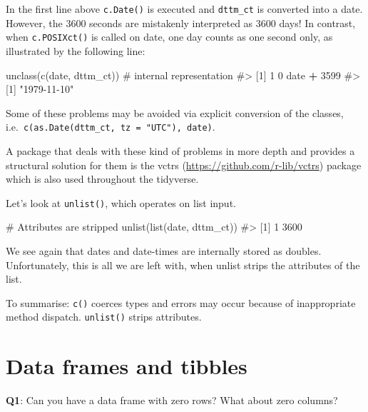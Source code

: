 \documentclass[
]{krantz}
\makeatletter
\newenvironment{Shaded}{\begin{snugshade}}{\end{snugshade}}
\newcommand{\CommentTok}[1]{\textcolor[rgb]{0.56,0.35,0.01}{\textit{#1}}}
\newcommand{\DecValTok}[1]{\textcolor[rgb]{0.00,0.00,0.81}{#1}}
\newcommand{\KeywordTok}[1]{\textcolor[rgb]{0.13,0.29,0.53}{\textbf{#1}}}
\newcommand{\NormalTok}[1]{#1}
\newcommand{\OperatorTok}[1]{\textcolor[rgb]{0.81,0.36,0.00}{\textbf{#1}}}
\newcommand{\StringTok}[1]{\textcolor[rgb]{0.31,0.60,0.02}{#1}}
\renewcommand{\href}[2]{#2 (\url{#1})}
\newenvironment{kframe}{%
\medskip{}
\setlength{\fboxsep}{.8em}
 \def\at@end@of@kframe{}%
 \ifinner\ifhmode%
  \def\at@end@of@kframe{\end{minipage}}%
  \begin{minipage}{\columnwidth}%
 \fi\fi%
 \def\FrameCommand##1{\hskip\@totalleftmargin \hskip-\fboxsep
 \colorbox{shadecolor}{##1}\hskip-\fboxsep
     \hskip-\linewidth \hskip-\@totalleftmargin \hskip\columnwidth}%
 \MakeFramed {\advance\hsize-\width
   \@totalleftmargin\z@ \linewidth\hsize
   \@setminipage}}%
 {\par\unskip\endMakeFramed%
 \at@end@of@kframe}
\renewenvironment{Shaded}{\begin{kframe}}{\end{kframe}}
\renewcommand{\KeywordTok} [1]{\textcolor[rgb]{0.00,0.44,0.13}{{#1}}}
\renewcommand{\DecValTok}  [1]{\textcolor[rgb]{0.25,0.63,0.44}{{#1}}}
\renewcommand{\StringTok}  [1]{\textcolor[rgb]{0.25,0.44,0.63}{{#1}}}
\renewcommand{\CommentTok} [1]{\textcolor[rgb]{0.38,0.63,0.69}{{#1}}}
\renewcommand{\NormalTok}  [1]{{#1}}
\makeatother
\begin{document}
In the first line above \texttt{c.Date()} is executed and \texttt{dttm\_ct} is converted into a date. However, the 3600 seconds are mistakenly interpreted as 3600 days! In contrast, when \texttt{c.POSIXct()} is called on date, one day counts as one second only, as illustrated by the following line:

\begin{Shaded}
\begin{Highlighting}[]
\KeywordTok{unclass}\NormalTok{(}\KeywordTok{c}\NormalTok{(date, dttm_ct))  }\CommentTok{# internal representation}
\CommentTok{#> [1] 1 0}
\NormalTok{date }\OperatorTok{+}\StringTok{ }\DecValTok{3599}
\CommentTok{#> [1] "1979-11-10"}
\end{Highlighting}
\end{Shaded}

Some of these problems may be avoided via explicit conversion of the classes, i.e.~\texttt{c(as.Date(dttm\_ct,\ tz\ =\ "UTC"),\ date)}.

A package that deals with these kind of problems in more depth and provides a structural solution for them is the \href{https://github.com/r-lib/vctrs}{vctrs} package which is also used throughout the tidyverse.

Let's look at \texttt{unlist()}, which operates on list input.

\begin{Shaded}
\begin{Highlighting}[]
\CommentTok{# Attributes are stripped}
\KeywordTok{unlist}\NormalTok{(}\KeywordTok{list}\NormalTok{(date, dttm_ct))  }
\CommentTok{#> [1]    1 3600}
\end{Highlighting}
\end{Shaded}

We see again that dates and date-times are internally stored as doubles. Unfortunately, this is all we are left with, when unlist strips the attributes of the list.

To summarise: \texttt{c()} coerces types and errors may occur because of inappropriate method dispatch. \texttt{unlist()} strips attributes.

\hypertarget{data-frames-and-tibbles}{%
\section{Data frames and tibbles}\label{data-frames-and-tibbles}}

\textbf{{Q1}}: Can you have a data frame with zero rows? What about zero columns?
\end{document}
